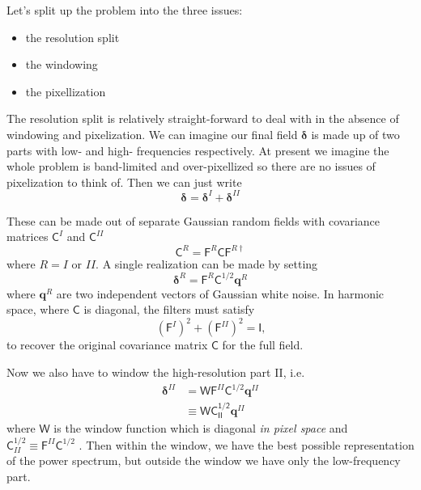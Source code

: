 \documentclass[11pt,a4paper,preprint]{aastex}
\newcommand{\bmath}[1]{\ensuremath{\bm{#1}}}
\renewcommand{\vec}[1]{\bmath{#1}}
\begin{document}
Let's split up the problem into the three issues:

\begin{itemize}
\item the resolution split
\item the windowing
\item the pixellization
\end{itemize}

The resolution split is relatively straight-forward to deal with in
the absence of windowing and pixelization. We can imagine our final
field $\vec{\delta}$ is made up of two parts with low- and high-
frequencies respectively.  At present we imagine the whole problem is
band-limited and over-pixellized so there are no issues of
pixelization to think of. Then we can just write
\begin{equation}
\vec{\delta} = \vec{\delta}^I + \vec{\delta}^{II}
\end{equation}

These can be made out of separate Gaussian random fields with
covariance matrices $\mathsf{C}^I$ and $\mathsf{C}^{II}$
\begin{equation}
\mathsf{C}^R = \mathsf{F}^R \mathsf{C} \mathsf{F}^{R\dagger}
\end{equation}
where $R=I$ or $II$. A single realization can be made by setting
\begin{equation}
\vec{\delta}^R = \mathsf{F}^R \mathsf{C}^{1/2} \vec{q}^R
\end{equation}
where $\vec{q}^R$ are two independent vectors of Gaussian white
noise.
 In harmonic space, where $\mathsf{C}$ is
diagonal, the filters must satisfy
\begin{equation}
(\mathsf{F}^{I})^2+ (\mathsf{F}^{II})^2 = \mathsf{I}\textrm{,}
\end{equation}
to recover the original covariance matrix $\mathsf{C}$ for the full
field.

Now we also have to window the high-resolution part II, i.e.
\begin{align}
\vec{\delta}^{II} & = \mathsf{W} \mathsf{F}^{II} \mathsf{C}^{1/2}
\vec{q}^{II}\\
& \equiv \mathsf{WC_{II}^{1/2}} \vec{q}^{II} \label{eq:deltaII-ideal}
\end{align}
where $\mathsf{W}$ is the window function which is
diagonal {\it in pixel space} and $\mathsf{C}_{II}^{1/2} \equiv
\mathsf{F}^{II} \mathsf{C}^{1/2}$ .  Then within the window, we have the
best possible representation of the power spectrum, but outside the
window we have only the low-frequency part.
\end{document}
